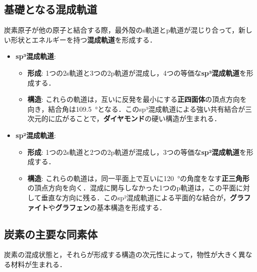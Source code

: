 \documentclass[11pt,a4paper]{ltjsarticle}
\newcommand{\supcite}[1]{\textsuperscript{\cite{#1}}}
\begin{document}
\subsection{基礎となる混成軌道}

炭素原子が他の原子と結合する際，最外殻のs軌道とp軌道が混じり合って，新しい形状とエネルギーを持つ\textbf{混成軌道}を形成する．

\begin{itemize}
\item \textbf{sp³混成軌道}:
  \begin{itemize}
  \item \textbf{形成}: 1つの2s軌道と3つの2p軌道が混成し，4つの等価な\textbf{sp³混成軌道}を形成する．
  \item \textbf{構造}: これらの軌道は，互いに反発を最小にする\textbf{正四面体}の頂点方向を向き，結合角は\SI{109.5}{\degree}となる．このsp³混成軌道による強い共有結合が三次元的に広がることで，\textbf{ダイヤモンド}の硬い構造が生まれる\supcite{ref1}．
  \end{itemize}

\item \textbf{sp²混成軌道}:
  \begin{itemize}
  \item \textbf{形成}: 1つの2s軌道と2つの2p軌道が混成し，3つの等価な\textbf{sp²混成軌道}を形成する．
  \item \textbf{構造}: これらの軌道は，同一平面上で互いに\SI{120}{\degree}の角度をなす\textbf{正三角形}の頂点方向を向く．混成に関与しなかった1つのp軌道は，この平面に対して垂直な方向に残る．このsp²混成軌道による平面的な結合が，\textbf{グラファイト}や\textbf{グラフェン}の基本構造を形成する\supcite{ref1}．
  \end{itemize}
\end{itemize}

\subsection{炭素の主要な同素体}

炭素の混成状態と，それらが形成する構造の次元性によって，物性が大きく異なる材料が生まれる．
\end{document}

